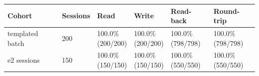 \begin{tabular}{llllll}
\hline
Cohort & Sessions & Read & Write & Read-back & Round-trip \\
\hline
templated batch & 200 & \shortstack{100.0\%\\(200/200)} & \shortstack{100.0\%\\(200/200)} & \shortstack{100.0\%\\(798/798)} & \shortstack{100.0\%\\(798/798)} \\
e2 sessions & 150 & \shortstack{100.0\%\\(150/150)} & \shortstack{100.0\%\\(150/150)} & \shortstack{100.0\%\\(550/550)} & \shortstack{100.0\%\\(550/550)} \\
\hline
\end{tabular}
